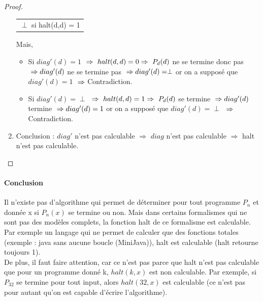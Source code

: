 \begin{mytheo}[halt]
\begin{proof}
\begin{enumerate}
\begin{tabular}{c}
				$\perp$ si halt(d,d) = 1\\
			\end{tabular}
			Mais,
			\begin{itemize}
				\item Si $diag'(d)= 1$ $\\
				\Rightarrow \  halt(d,d) = 0 \\
				\Rightarrow \ P_d(d)$ ne se termine donc pas $ \\
				\Rightarrow diag'(d)$ ne se termine pas $ \\
				\Rightarrow diag'(d) = \perp$ or on a supposé que $diag'(d) = 1$ $ \\
				\Rightarrow $
				Contradiction.

				\item Si $diag'(d)= \perp$ $\\
				\Rightarrow \  halt(d,d) = 1 \\
				\Rightarrow \ P_d(d)$ se termine $ \\
				\Rightarrow diag'(d)$ termine $ \\
				\Rightarrow diag'(d) = 1$ or on a supposé que $diag'(d) = \perp$ $ \\
				\Rightarrow $
				Contradiction.
			\end{itemize}
		\item Conclusion : $diag'$ n'est pas calculable $ \Rightarrow $ $diag$
		n'est pas calculable $ \Rightarrow $ halt n'est pas calculable.

	\end{enumerate}
	\end{proof}

\end{mytheo}

\paragraph{Conclusion} Il n'existe pas d'algorithme qui permet de déterminer pour tout programme $P_n$ et donnée x si $P_n(x)$ se termine ou non. Mais dans certains formalismes qui ne sont pas des modèles complets, la fonction halt de ce formalisme est calculable.
Par exemple un langage qui ne permet de calculer
que des fonctions totales (exemple : java sans aucune boucle (MiniJava)), halt est calculable (halt retourne toujours 1). \\

De plus, il faut faire attention, car ce n'est pas parce que halt n'est pas calculable que pour un programme donné k, $halt(k,x)$ est non calculable. 
Par exemple, si $P_{32}$ se termine pour tout input, alors $halt(32, x)$ est calculable (ce n'est pas pour autant qu'on est capable d'écrire l'algorithme).

